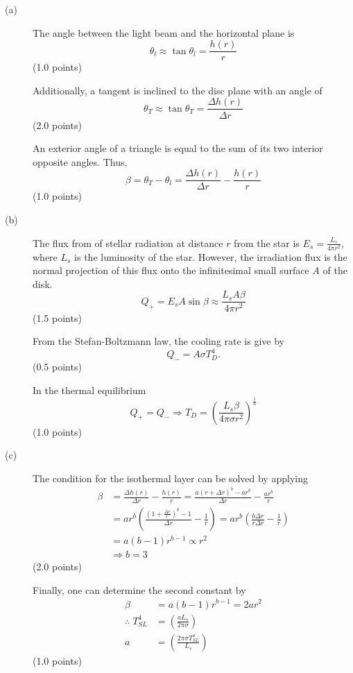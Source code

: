 \begin{description}
\item[(a)] The angle between the light beam and the horizontal plane is
  \[
    \theta_l \approx \tan\theta_l = \frac{h(r)}{r}
  \]
  \hfill(1.0 points)

  Additionally, a tangent is inclined to the disc plane with an angle of
  \[
    \theta_T \approx \tan\theta_T = \frac{\Delta h(r)}{\Delta r}
  \]
  \hfill(2.0 points)

  An exterior angle of a triangle is equal to the sum of its two interior
  opposite angles. Thus,
  \[
    \beta = \theta_T - \theta_l = \frac{\Delta h(r)}{\Delta r} - \frac{h(r)}{r}
  \]
  \hfill(1.0 points)
\item[(b)] The flux from of stellar radiation at distance $r$ from the star is
  $E_s = \frac{L_s}{4\pi r^2}$, where $L_s$ is the luminosity of the star.
  However, the irradiation flux is the normal projection of this flux onto the
  infinitesimal small surface $A$ of the disk.
  \[
    Q_+ = E_s A\sin\beta \approx \frac{L_s A\beta}{4\pi r^2}
  \]
  \hfill(1.5 points)

  From the Stefan-Boltzmann law, the cooling rate is give by
  \[
    Q_- = A\sigma T_D^4.
  \]
  \hfill(0.5 points)

  In the thermal equilibrium
  \[
    Q_+ = Q_- \Longrightarrow
    T_D = \left(\frac{L_s\beta}{4\pi\sigma r^2}\right)^{\!\frac{1}{4}}
  \]
  \hfill(1.0 points)
\item[(c)] The condition for the isothermal layer can be solved by applying
  \begin{align*}
    \beta &= \frac{\Delta h(r)}{\Delta r} - \frac{h(r)}{r}
      = \frac{a(r+\Delta r)^b - ar^b}{\Delta r} - \frac{ar^b}{r} \\
    &= ar^b\left(\frac{(1+\frac{\Delta r}{r})^b - 1}{\Delta r} - \frac{1}{r}\right)
      = ar^b\left(\frac{b\Delta r}{r\Delta r} - \frac{1}{r}\right) \\
    &= a(b-1)r^{b-1} \propto r^2 \\
    &\Longrightarrow b = 3
  \end{align*}
  \hfill(2.0 points)

  Finally, one can determine the second constant by
  \begin{align*}
    \beta &= a(b-1)r^{b-1} = 2ar^2 \\
    \therefore\; T_{SL}^4 &= \left(\frac{aL_s}{2\pi\sigma}\right) \\
    a &= \left(\frac{2\pi\sigma T_{SL}^4}{L_s}\right)
  \end{align*}
  \hfill(1.0 points)
\end{description}

